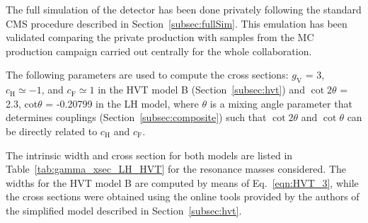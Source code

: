 The full simulation of the detector has been done privately following the standard CMS procedure described in Section~\ref{subsec:fullSim}.
This emulation has been validated comparing the private production with samples from the MC production campaign carried out centrally for the whole collaboration.

The following parameters are used to compute the cross sections: $g_\mathrm{V}$ = 3, $c_\mathrm{H} \simeq -1$, and $c_\mathrm{F} \simeq 1$
in the HVT model B (Section~\ref{subsec:hvt}) and $\cot 2 \theta$ = 2.3, cot$\theta$ = -0.20799 in the LH model, where $\theta$ is a mixing
angle parameter that determines \Wpr couplings (Section~\ref{subsec:composite}) such that $\cot 2 \theta$ and $\cot\theta$ can be directly related to $c_\mathrm{H}$ and $c_\mathrm{F}$.

The intrinsic width and cross section for both models are listed in Table~\ref{tab:gamma_xsec_LH_HVT} for the resonance masses considered.
The widths for the HVT model B are computed by means of Eq.~\ref{eqn:HVT_3},
while the cross sections were obtained using the online tools provided by the authors of the simplified model described in Section~\ref{subsec:hvt}.

